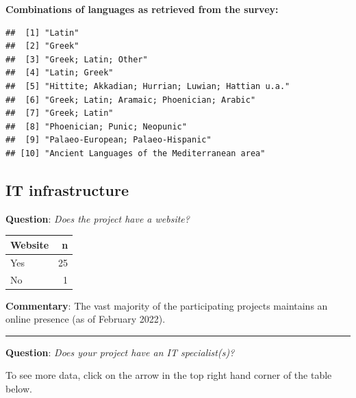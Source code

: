 \documentclass[
  10pt,
]{article}
\begin{document}
\textbf{Combinations of languages as retrieved from the survey:}

\begin{verbatim}
##  [1] "Latin"                                           
##  [2] "Greek"                                           
##  [3] "Greek; Latin; Other"                             
##  [4] "Latin; Greek"                                    
##  [5] "Hittite; Akkadian; Hurrian; Luwian; Hattian u.a."
##  [6] "Greek; Latin; Aramaic; Phoenician; Arabic"       
##  [7] "Greek; Latin"                                    
##  [8] "Phoenician; Punic; Neopunic"                     
##  [9] "Palaeo-European; Palaeo-Hispanic"                
## [10] "Ancient Languages of the Mediterranean area"
\end{verbatim}

\hypertarget{it-infrastructure-1}{%
\subsection{IT infrastructure}\label{it-infrastructure-1}}

\textbf{Question}: \emph{Does the project have a website?}

\begin{longtable}[]{@{}lr@{}}
\toprule
Website & n \\
\midrule
\endhead
Yes & 25 \\
No & 1 \\
\bottomrule
\end{longtable}

\textbf{Commentary}: The vast majority of the participating projects
maintains an online presence (as of February 2022).

\begin{center}\rule{0.5\linewidth}{0.5pt}\end{center}

\textbf{Question}: \emph{Does your project have an IT specialist(s)?}

To see more data, click on the arrow in the top right hand corner of the
table below.
\end{document}
